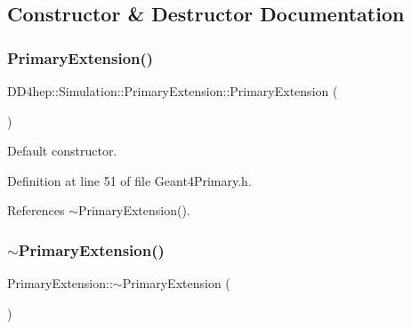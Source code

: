 \subsection{Constructor \& Destructor Documentation}
\hypertarget{class_d_d4hep_1_1_simulation_1_1_primary_extension_af38d37160f1a2bcc08ac36aa866be163}{}\label{class_d_d4hep_1_1_simulation_1_1_primary_extension_af38d37160f1a2bcc08ac36aa866be163} 
\subsubsection{\texorpdfstring{Primary\+Extension()}{PrimaryExtension()}}
{\footnotesize\ttfamily D\+D4hep\+::\+Simulation\+::\+Primary\+Extension\+::\+Primary\+Extension (\begin{DoxyParamCaption}{ }\end{DoxyParamCaption})\hspace{0.3cm}{\ttfamily [inline]}}



Default constructor. 



Definition at line 51 of file Geant4\+Primary.\+h.



References $\sim$\+Primary\+Extension().

\hypertarget{class_d_d4hep_1_1_simulation_1_1_primary_extension_a5fb5927720e46d98279b72bfe42c061f}{}\label{class_d_d4hep_1_1_simulation_1_1_primary_extension_a5fb5927720e46d98279b72bfe42c061f} 
\subsubsection{\texorpdfstring{$\sim$\+Primary\+Extension()}{~PrimaryExtension()}}
{\footnotesize\ttfamily Primary\+Extension\+::$\sim$\+Primary\+Extension (\begin{DoxyParamCaption}{ }\end{DoxyParamCaption})\hspace{0.3cm}{\ttfamily [virtual]}}



